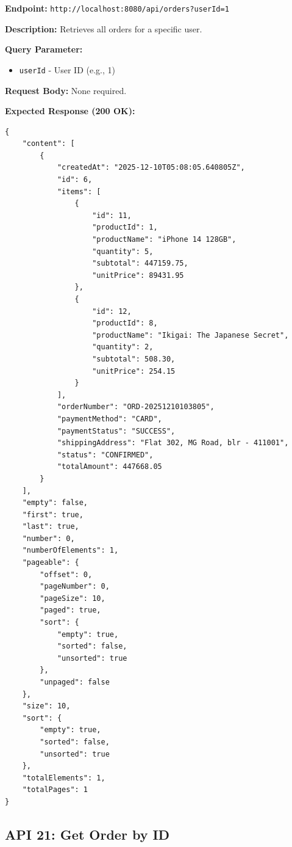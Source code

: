 \documentclass[12pt, a4paper]{article}
\begin{document}
\begin{tcolorbox}[colback=getcolor!10, colframe=getcolor, title=GET]
\textbf{Endpoint:} \texttt{http://localhost:8080/api/orders?userId=1}
\end{tcolorbox}

\textbf{Description:} Retrieves all orders for a specific user.

\textbf{Query Parameter:}
\begin{itemize}
    \item \texttt{userId} - User ID (e.g., 1)
\end{itemize}

\textbf{Request Body:} None required.

\textbf{Expected Response (200 OK):}
\begin{lstlisting}
{
    "content": [
        {
            "createdAt": "2025-12-10T05:08:05.640805Z",
            "id": 6,
            "items": [
                {
                    "id": 11,
                    "productId": 1,
                    "productName": "iPhone 14 128GB",
                    "quantity": 5,
                    "subtotal": 447159.75,
                    "unitPrice": 89431.95
                },
                {
                    "id": 12,
                    "productId": 8,
                    "productName": "Ikigai: The Japanese Secret",
                    "quantity": 2,
                    "subtotal": 508.30,
                    "unitPrice": 254.15
                }
            ],
            "orderNumber": "ORD-20251210103805",
            "paymentMethod": "CARD",
            "paymentStatus": "SUCCESS",
            "shippingAddress": "Flat 302, MG Road, blr - 411001",
            "status": "CONFIRMED",
            "totalAmount": 447668.05
        }
    ],
    "empty": false,
    "first": true,
    "last": true,
    "number": 0,
    "numberOfElements": 1,
    "pageable": {
        "offset": 0,
        "pageNumber": 0,
        "pageSize": 10,
        "paged": true,
        "sort": {
            "empty": true,
            "sorted": false,
            "unsorted": true
        },
        "unpaged": false
    },
    "size": 10,
    "sort": {
        "empty": true,
        "sorted": false,
        "unsorted": true
    },
    "totalElements": 1,
    "totalPages": 1
}
\end{lstlisting}

\vspace{0.5cm}

\subsection{API 21: Get Order by ID}
\end{document}
